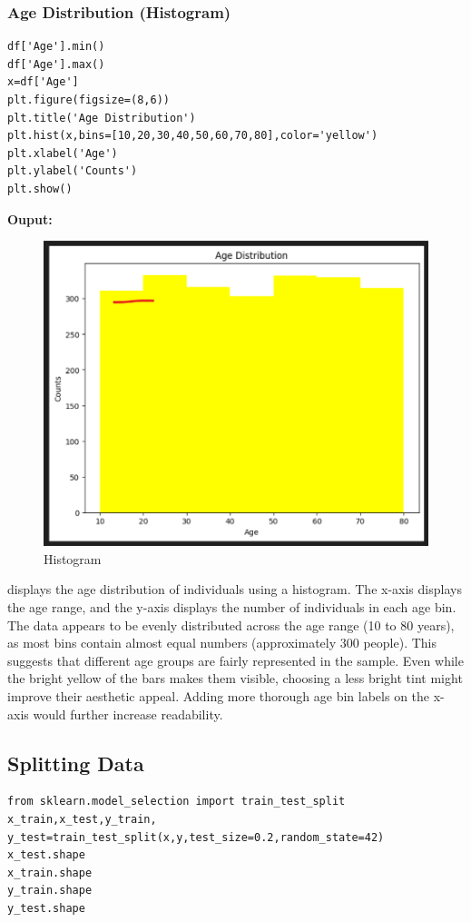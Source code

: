 \subsubsection{ Age Distribution (Histogram)}
\begin{verbatim}
df['Age'].min()
df['Age'].max()
x=df['Age']
plt.figure(figsize=(8,6))
plt.title('Age Distribution')
plt.hist(x,bins=[10,20,30,40,50,60,70,80],color='yellow')
plt.xlabel('Age')
plt.ylabel('Counts')
plt.show()
\end{verbatim}
\textbf{Ouput:}
\begin{figure}[h]
\centering
\includegraphics[width=0.7\linewidth]{Images/g1.png}
\caption{Histogram}
\label{fig:enter-label}
\end{figure}
 displays the age distribution of individuals using a histogram. The x-axis displays the age range, and the y-axis displays the number of individuals in each age bin. The data appears to be evenly distributed across the age range (10 to 80 years), as most bins contain almost equal numbers (approximately 300 people). This suggests that different age groups are fairly represented in the sample. Even while the bright yellow of the bars makes them visible, choosing a less bright tint might improve their aesthetic appeal. Adding more thorough age bin labels on the x-axis would further increase readability.

\subsection{Splitting Data}
\begin{verbatim}
from sklearn.model_selection import train_test_split
x_train,x_test,y_train,
y_test=train_test_split(x,y,test_size=0.2,random_state=42)
x_test.shape
x_train.shape
y_train.shape
y_test.shape
\end{verbatim}

